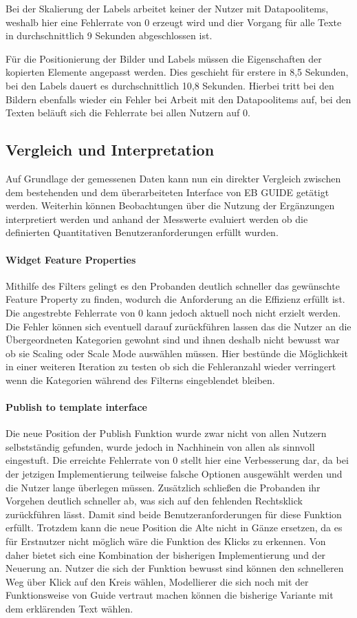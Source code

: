 Bei der Skalierung der Labels arbeitet keiner der Nutzer mit Datapoolitems, weshalb hier eine Fehlerrate von 0 erzeugt wird und dier Vorgang für alle Texte in durchschnittlich 9 Sekunden abgeschlossen ist.

Für die Positionierung der Bilder und Labels müssen die Eigenschaften der kopierten Elemente angepasst werden.
Dies geschieht für erstere in 8,5 Sekunden, bei den Labels dauert es durchschnittlich 10,8 Sekunden.
Hierbei tritt bei den Bildern ebenfalls wieder ein Fehler bei Arbeit mit den Datapoolitems auf, bei den Texten beläuft sich die Fehlerrate bei allen Nutzern auf 0.

\subsection{Vergleich und Interpretation}
Auf Grundlage der gemessenen Daten kann nun ein direkter Vergleich zwischen dem bestehenden und dem überarbeiteten Interface von EB GUIDE getätigt werden.
Weiterhin können Beobachtungen über die Nutzung der Ergänzungen interpretiert werden und anhand der Messwerte evaluiert werden ob die definierten Quantitativen Benutzeranforderungen erfüllt wurden.

\paragraph{Widget Feature Properties}
Mithilfe des Filters gelingt es den Probanden deutlich schneller das gewünschte Feature Property zu finden, wodurch die Anforderung an die Effizienz erfüllt ist.
Die angestrebte Fehlerrate von 0 kann jedoch aktuell noch nicht erzielt werden.
Die Fehler können sich eventuell darauf zurückführen lassen das die Nutzer an die Übergeordneten Kategorien gewohnt sind und ihnen deshalb nicht bewusst war ob sie Scaling oder Scale Mode auswählen müssen.
Hier bestünde die Möglichkeit in einer weiteren Iteration zu testen ob sich die Fehleranzahl wieder verringert wenn die Kategorien während des Filterns eingeblendet bleiben.

\paragraph{Publish to template interface}
Die neue Position der Publish Funktion wurde zwar nicht von allen Nutzern selbstständig gefunden, wurde jedoch in Nachhinein von allen als sinnvoll eingestuft.
Die erreichte Fehlerrate von 0 stellt hier eine Verbesserung dar, da bei der jetzigen Implementierung teilweise falsche Optionen ausgewählt werden und die Nutzer lange überlegen müssen.
Zusätzlich schließen die Probanden ihr Vorgehen deutlich schneller ab, was sich auf den fehlenden Rechtsklick zurückführen lässt.
Damit sind beide Benutzeranforderungen für diese Funktion erfüllt.
Trotzdem kann die neue Position die Alte nicht in Gänze ersetzen, da es für Erstnutzer nicht möglich wäre die Funktion des Klicks zu erkennen.
Von daher bietet sich eine Kombination der bisherigen Implementierung und der Neuerung an.
Nutzer die sich der Funktion bewusst sind können den schnelleren Weg über Klick auf den Kreis wählen, Modellierer die sich noch mit der Funktionsweise von Guide vertraut machen können die bisherige Variante mit dem erklärenden Text wählen.

